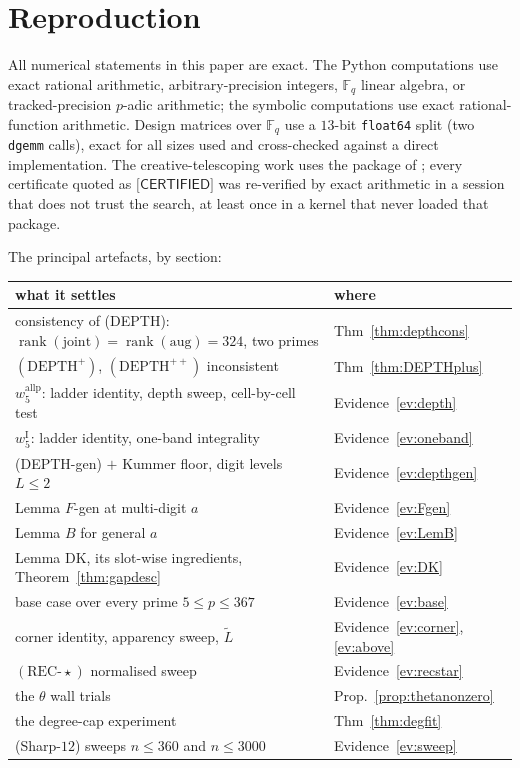 \documentclass[11pt,reqno]{amsart}
\theoremstyle{plain}
\theoremstyle{definition}
\theoremstyle{remark}
\numberwithin{equation}{section}
\newcommand{\FF}{\mathbb{F}}
\newcommand{\rank}{\operatorname{rank}}
\newcommand{\CERTIFIED}{\textsf{[CERTIFIED]}}
\begin{document}
\appendix
\section{Reproduction}\label{app:repro}

All numerical statements in this paper are exact. The Python computations use exact rational
arithmetic, arbitrary-precision integers, $\FF_q$ linear algebra, or tracked-precision $p$-adic
arithmetic; the symbolic computations use exact rational-function
arithmetic. Design matrices over $\FF_q$ use a $13$-bit \texttt{float64} split (two
\texttt{dgemm} calls), exact for all sizes used and cross-checked against a direct
implementation. The creative-telescoping work uses the package of \cite{Ko10}; every
certificate quoted as $\CERTIFIED$ was re-verified by exact arithmetic in a session that does
not trust the search, at least once in a kernel that never loaded that package.

\medskip
\noindent The principal artefacts, by section:

\begin{center}
\small
\begin{tabular}{@{}ll@{}}
\toprule
what it settles & where\\
\midrule
consistency of (DEPTH): $\rank(\mathrm{joint})=\rank(\mathrm{aug})=324$, two primes & Thm~\ref{thm:depthcons}\\
$(\mathrm{DEPTH}^+)$, $(\mathrm{DEPTH}^{++})$ inconsistent & Thm~\ref{thm:DEPTHplus}\\
$w_5^{\mathrm{allp}}$: ladder identity, depth sweep, cell-by-cell test & Evidence~\ref{ev:depth}\\
$w_5^{\mathrm I}$: ladder identity, one-band integrality & Evidence~\ref{ev:oneband}\\
(DEPTH-gen) $+$ Kummer floor, digit levels $L\le2$ & Evidence~\ref{ev:depthgen}\\
Lemma $F$-gen at multi-digit $a$ & Evidence~\ref{ev:Fgen}\\
Lemma $B$ for general $a$ & Evidence~\ref{ev:LemB}\\
Lemma DK, its slot-wise ingredients, Theorem~\ref{thm:gapdesc} & Evidence~\ref{ev:DK}\\
base case over every prime $5\le p\le367$ & Evidence~\ref{ev:base}\\
corner identity, apparency sweep, $\tilde L$ & Evidence~\ref{ev:corner}, \ref{ev:above}\\
$(\mathrm{REC}\text{-}\star)$ normalised sweep & Evidence~\ref{ev:recstar}\\
the $\theta$ wall trials & Prop.~\ref{prop:thetanonzero}\\
the degree-cap experiment & Thm~\ref{thm:degfit}\\
(Sharp-$12$) sweeps $n\le360$ and $n\le3000$ & Evidence~\ref{ev:sweep}\\
\bottomrule
\end{tabular}
\end{center}
\end{document}
